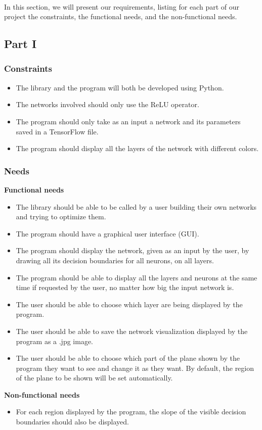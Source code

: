 \documentclass[a4paper]{article}
\begin{document}
\paragraph{}In this section, we will present our requirements, listing for each part of our project the constraints, the functional needs, and the non-functional needs. 

\subsection{Part I}
\subsubsection{Constraints}
\begin{itemize}
\item The library and the program will both be developed using Python.
\item The networks involved should only use the ReLU operator. 
\item The program should only take as an input a network and its parameters saved in a TensorFlow file.
\item The program should display all the layers of the network with different colors.
\end{itemize}

\subsubsection{Needs}
\noindent\textbf{Functional needs}
\begin{itemize}
\item The library should be able to be called by a user building their own networks and trying to optimize them.
\item The program should have a graphical user interface (GUI).
\item The program should display the network, given as an input by the user, by drawing all its decision boundaries for all neurons, on all layers. 
\item The program should be able to display all the layers and neurons at the same time if requested by the user, no matter how big the input network is.
\item The user should be able to choose which layer are being displayed by the program. 
\item The user should be able to save the network visualization displayed by the program as a .jpg image.
\item The user should be able to choose which part of the plane shown by the program they want to see and change it as they want. By default, the region of the plane to be shown will be set automatically. 

\end{itemize}
\noindent\textbf{Non-functional needs}
\begin{itemize}
\item For each region displayed by the program, the slope of the visible decision boundaries should also be displayed.
\end{itemize}
\end{document}
